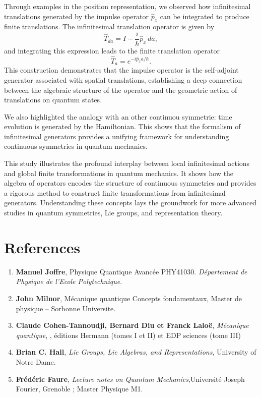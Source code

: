 \documentclass{article}
\begin{document}
Through examples in the position representation, we observed how infinitesimal translations generated by the impulse operator $\hat{p}_x$ can be integrated to produce finite translations. The infinitesimal translation operator is given by
$$
\hat{T}_{da} = \hat{I} - \frac{i}{\hbar} \hat{p}_x \, da,
$$
and integrating this expression leads to the finite translation operator
$$
\hat{T}_a = e^{-i \hat{p}_x a / \hbar}.
$$
This construction demonstrates that the impulse operator is the self-adjoint generator associated with spatial translations, establishing a deep connection between the algebraic structure of the operator and the geometric action of translations on quantum states.

We also highlighted the analogy with an other continuou symmetrie: time evolution is generated by the Hamiltonian. This shows that the formalism of infinitesimal generators provides a unifying framework for understanding continuous symmetries in quantum mechanics.

This study illustrates the profound interplay between local infinitesimal actions and global finite transformations in quantum mechanics. It shows how the algebra of operators encodes the structure of continuous symmetries and provides a rigorous method to construct finite transformations from infinitesimal generators. Understanding these concepts lays the groundwork for more advanced studies in quantum symmetries, Lie groups, and representation theory.

\newpage

\section{\textbf{References}}

\begin{enumerate}[label=\textbf{\arabic*.}, leftmargin=2em, labelsep=0.5em]
	\item \textbf{Manuel Joffre}, Physique Quantique Avancée
	PHY41030. \textit{Département de Physique de l’Ecole Polytechnique}.
	
	\item \textbf{John Milnor}, Mécanique quantique
	Concepts fondamentaux, Master de physique – Sorbonne Universite.
	
	\item \textbf{Claude Cohen-Tannoudji, Bernard Diu et Franck Laloë}, \textit{Mécanique quantique},  , éditions
	Hermann (tomes I et II) et EDP sciences (tome III)
	
	\item \textbf{Brian C. Hall}, \textit{Lie Groups, Lie Algebras, and Representations}, University of Notre Dame.
	
	
	\item \textbf{Frédéric Faure}, \textit{Lecture notes on Quantum Mechanics},Université Joseph Fourier, Grenoble ;
	Master Physique M1.
	
\end{enumerate}
\end{document}
